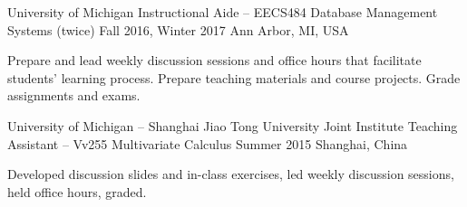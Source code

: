 \begin{cventries}

\cventry
  {University of Michigan} %
  {Instructional Aide – EECS484 Database Management Systems (twice)} %
  {Fall 2016, Winter 2017} %
  {Ann Arbor, MI, USA} %
  {
    \begin{cvitems} %
      \item {Prepare and lead weekly discussion sessions and office hours that facilitate students' learning process. Prepare teaching materials and course projects. Grade assignments and exams.}
    \end{cvitems}
  }

\cventry
  {University of Michigan – Shanghai Jiao Tong University Joint Institute} %
  {Teaching Assistant – Vv255 Multivariate Calculus} %
  {Summer 2015} %
  {Shanghai, China} %
  {
    \begin{cvitems} %
      \item {Developed discussion slides and in-class exercises, led weekly discussion sessions, held office hours, graded.}
    \end{cvitems}
  }

\end{cventries}